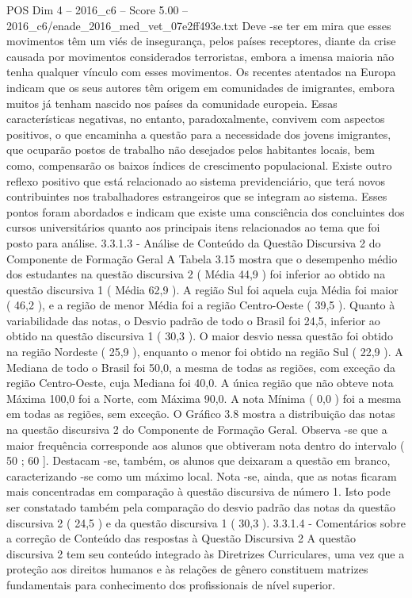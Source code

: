 \begin{textsample}{POS Dim 4 – 2016\_c6 – Score 5.00 – 2016\_c6/enade\_2016\_med\_vet\_07e2ff493e.txt}
Deve -se ter em mira que esses movimentos têm um viés de insegurança, pelos países receptores, diante da crise causada por movimentos considerados terroristas, embora a imensa maioria não tenha qualquer vínculo com esses movimentos.
Os recentes atentados na Europa indicam que os seus autores têm origem em comunidades de imigrantes, embora muitos já tenham nascido nos países da comunidade europeia.
Essas características negativas, no entanto, paradoxalmente, convivem com aspectos positivos, o que encaminha a questão para a necessidade dos jovens imigrantes, que ocuparão postos de trabalho não desejados pelos habitantes locais, bem como, compensarão os baixos índices de crescimento populacional.
Existe outro reflexo positivo que está relacionado ao sistema previdenciário, que terá novos contribuintes nos trabalhadores estrangeiros que se integram ao sistema.
Esses pontos foram abordados e indicam que existe uma consciência dos concluintes dos cursos universitários quanto aos principais itens relacionados ao tema que foi posto para análise. 3.3.1.3 - Análise de Conteúdo da Questão Discursiva 2 do Componente de Formação Geral A Tabela 3.15 mostra que o desempenho médio dos estudantes na questão discursiva 2 ( Média 44,9 ) foi inferior ao obtido na questão discursiva 1 ( Média 62,9 ).
A região Sul foi aquela cuja Média foi maior ( 46,2 ), e a região de menor Média foi a região Centro-Oeste ( 39,5 ).
Quanto à variabilidade das notas, o Desvio padrão de todo o Brasil foi 24,5, inferior ao obtido na questão discursiva 1 ( 30,3 ).
O maior desvio nessa questão foi obtido na região Nordeste ( 25,9 ), enquanto o menor foi obtido na região Sul ( 22,9 ).
A Mediana de todo o Brasil foi 50,0, a mesma de todas as regiões, com exceção da região Centro-Oeste, cuja Mediana foi 40,0.
A única região que não obteve nota Máxima 100,0 foi a Norte, com Máxima 90,0.
A nota Mínima ( 0,0 ) foi a mesma em todas as regiões, sem exceção.
O Gráfico 3.8 mostra a distribuição das notas na questão discursiva 2 do Componente de Formação Geral.
Observa -se que a maior frequência corresponde aos alunos que obtiveram nota dentro do intervalo ( 50 ; 60 ].
Destacam -se, também, os alunos que deixaram a questão em branco, caracterizando -se como um máximo local.
Nota -se, ainda, que as notas ficaram mais concentradas em comparação à questão discursiva de número 1.
Isto pode ser constatado também pela comparação do desvio padrão das notas da questão discursiva 2 ( 24,5 ) e da questão discursiva 1 ( 30,3 ). 3.3.1.4 - Comentários sobre a correção de Conteúdo das respostas à Questão Discursiva 2 A questão discursiva 2 tem seu conteúdo integrado às Diretrizes Curriculares, uma vez que a proteção aos direitos humanos e às relações de gênero constituem matrizes fundamentais para conhecimento dos profissionais de nível superior.

\end{textsample}
